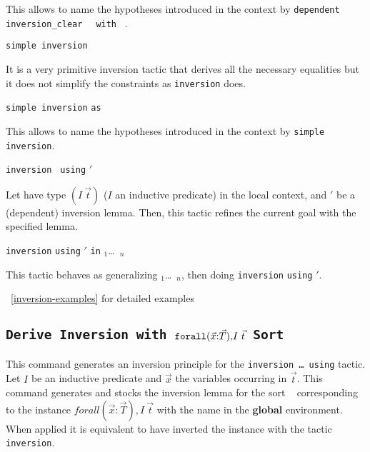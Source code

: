 \begin{Variants}
  This allows to name the hypotheses introduced in the context by
  \texttt{dependent inversion\_clear } {\ident} \texttt{ with } \term.

\item {} \texttt{simple inversion} {\ident}
  
  It is a very primitive inversion tactic that derives all the necessary
  equalities  but it does not simplify the  constraints as
  \texttt{inversion} does.

\item {} \texttt{simple inversion}
  {\ident} \texttt{as} {\intropattern} 
  
  This allows to name the hypotheses introduced in the context by
  \texttt{simple inversion}.

\item {} \texttt{inversion} \ident
  \texttt{ using} \ident$'$  
  
  Let {\ident} have type $(I~\vec{t})$ ($I$ an inductive
  predicate) in the local context, and \ident$'$ be a (dependent) inversion
  lemma. Then, this tactic refines the current goal with the specified
  lemma.

\item {} \texttt{inversion}
  {\ident} \texttt{using} \ident$'$ \texttt{in} \ident$_1$\dots\ \ident$_n$
  
  This tactic behaves as generalizing \ident$_1$\dots\ \ident$_n$,
  then doing \texttt{inversion} {\ident} \texttt{using} \ident$'$.

\end{Variants}

\SeeAlso~\ref{inversion-examples} for detailed examples

\subsection{\tt Derive Inversion {\ident} with
  ${\tt forall (}\vec{x}{\tt :}\vec{T}{\tt),} I~\vec{t}$ Sort \sort
\label{Derive-Inversion}
}

This command generates an inversion principle for the
\texttt{inversion \dots\ using} tactic.
Let $I$ be an inductive predicate and $\vec{x}$ the variables
occurring in $\vec{t}$. This command generates and stocks the
inversion lemma for the sort \sort~ corresponding to the instance
$forall (\vec{x}:\vec{T}), I~\vec{t}$ with the name {\ident} in the {\bf
global} environment. When applied it is equivalent to have inverted
the instance with the tactic {\tt inversion}.

